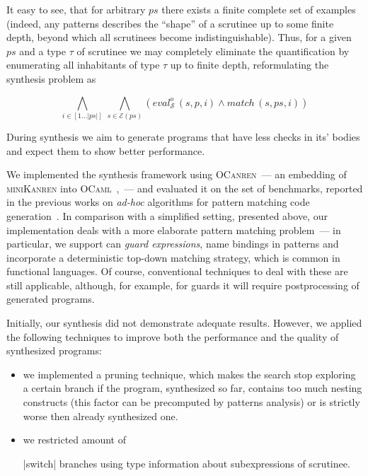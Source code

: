 \documentclass[submission,copyright,creativecommons]{eptcs}
\newcommand*{\SavedLstInline}{}
\DeclareRobustCommand*{\lstinline}{%
  \ifmmode
    \let\SavedBGroup\bgroup
    \def\bgroup{%
      \let\bgroup\SavedBGroup
      \hbox\bgroup
    }%
  \fi
  \SavedLstInline
}
\newcommand{\ir}{\ensuremath{\mathcal{S}}}
\begin{document}
It easy to see, that for arbitrary $ps$ there exists a finite complete set of examples (indeed, any patterns describes the ``shape''
of a scrutinee up to some finite depth, beyond which all scrutinees become indistinguishable). Thus, for a given $ps$ and a type $\tau$ of scrutinee we may
completely eliminate the quantification by enumerating all inhabitants of type $\tau$ up to finite depth, reformulating the synthesis problem as

\[
\bigwedge_{i\in[1\dots|ps|]}\,\bigwedge_{s\in\mathcal{E}(ps)} (eval^o_{\ir}\, (s, p, i) \wedge match\, (s, ps, i))
\]

During synthesis we aim to generate programs that have less checks in its' bodies and expect them to show better performance.

We implemented the synthesis framework using \textsc{OCanren}~--- an embedding of \textsc{miniKanren} into \textsc{OCaml}~\cite{ocanren},~---
and evaluated it on the set of benchmarks, reported in the previous works on \emph{ad-hoc} algorithms for pattern matching
code generation~\cite{maranget2001,maranget2008}. In comparison with a simplified setting, presented above, our implementation
deals with a more elaborate pattern matching problem~--- in particular, we support can \emph{guard expressions}, name bindings in
patterns and incorporate a deterministic top-down matching strategy, which is common in functional languages. Of course, conventional techniques to deal with these are still applicable, although, for example, for guards it will require postprocessing of generated programs.

Initially, our synthesis did not demonstrate adequate results. However, we applied the following techniques to improve both the performance
and the quality of synthesized programs:

\begin{itemize}
\item we implemented a pruning technique, which makes the search stop exploring a certain branch if the program, synthesized so far,
  contains too much nesting constructs (this factor can be precomputed by patterns analysis) or is strictly worse then already synthesized one.
  
\item we restricted amount of \lstinline|switch| branches using type information about subexpressions of scrutinee.
\end{itemize}
\end{document}
